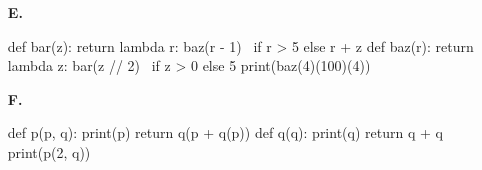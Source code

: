 \begin{multicols*}{2}
\begin{enumerate}
\item[\textbf{E.}]
\begin{python}
def bar(z):
    return lambda r: baz(r - 1) \
            if r > 5 else r + z
def baz(r):
    return lambda z: bar(z // 2) \
            if z > 0 else 5
print(baz(4)(100)(4))
\end{python}
\begin{flushright}
    [5 marks]
\end{flushright}

\item[\textbf{F.}]
\begin{python}
def p(p, q):
    print(p)
    return q(p + q(p))
def q(q):
    print(q)
    return q + q
print(p(2, q))
\end{python}
\begin{flushright}
    [5 marks]
\end{flushright}
\end{enumerate}
\end{multicols*}

\newpage
